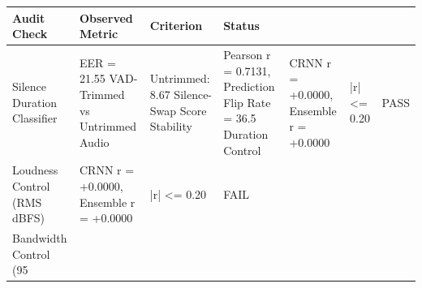 \begin{tabular}{llll}
\toprule
Audit Check & Observed Metric & Criterion & Status \\
\midrule
Silence Duration Classifier & EER = 21.55%
VAD-Trimmed vs Untrimmed Audio & Untrimmed: 8.67%
Silence-Swap Score Stability & Pearson r = 0.7131, Prediction Flip Rate = 36.5%
Duration Control & CRNN r = +0.0000, Ensemble r = +0.0000 & |r| <= 0.20 & PASS \\
Loudness Control (RMS dBFS) & CRNN r = +0.0000, Ensemble r = +0.0000 & |r| <= 0.20 & FAIL \\
Bandwidth Control (95%
\bottomrule
\end{tabular}
